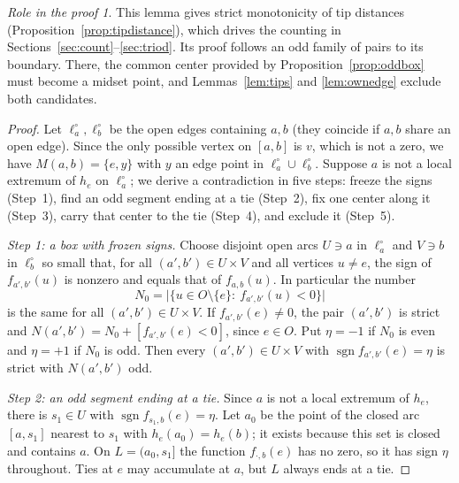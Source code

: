 \documentclass[11pt]{amsart}
\theoremstyle{definition}
\theoremstyle{remark}
\newtheorem*{role}{Role in the proof}
\newcommand{\M}{M}
\newcommand{\Odd}{O}
\newcommand{\N}{N}
\newcommand{\sgn}{\operatorname{sgn}}
\begin{document}
\begin{role}
This lemma gives strict monotonicity of tip distances (Proposition~\ref{prop:tipdistance}), which drives the counting in Sections~\ref{sec:count}--\ref{sec:triod}. Its proof follows an odd family of pairs to its boundary. There, the common center provided by Proposition~\ref{prop:oddbox} must become a midset point, and Lemmas~\ref{lem:tips} and \ref{lem:ownedge} exclude both candidates.
\end{role}

\begin{proof}
Let $\ell_a^\circ,\ell_b^\circ$ be the open edges containing $a,b$ (they coincide if $a,b$ share an open edge). Since the only possible vertex on $[a,b]$ is $v$, which is not a zero, we have $\M(a,b)=\{e,y\}$ with $y$ an edge point in $\ell_a^\circ\cup \ell_b^\circ$. Suppose $a$ is not a local extremum of $h_e$ on $\ell_a^\circ$; we derive a contradiction in five steps: freeze the signs (Step~1), find an odd segment ending at a tie (Step~2), fix one center along it (Step~3), carry that center to the tie (Step~4), and exclude it (Step~5).

\emph{Step 1: a box with frozen signs.} Choose disjoint open arcs $U\ni a$ in $\ell_a^\circ$ and $V\ni b$ in $\ell_b^\circ$ so small that, for all $(a',b')\in U\times V$ and all vertices $u\ne e$, the sign of $f_{a',b'}(u)$ is nonzero and equals that of $f_{a,b}(u)$. In particular the number
\[
  N_0=\bigl|\{u\in\Odd\setminus\{e\}:\ f_{a',b'}(u)<0\}\bigr|
\]
is the same for all $(a',b')\in U\times V$. If $f_{a',b'}(e)\ne0$, the pair $(a',b')$ is strict and $\N(a',b')=N_0+[f_{a',b'}(e)<0]$, since $e\in\Odd$. Put $\eta=-1$ if $N_0$ is even and $\eta=+1$ if $N_0$ is odd. Then every $(a',b')\in U\times V$ with $\sgn f_{a',b'}(e)=\eta$ is strict with $\N(a',b')$ odd.

\emph{Step 2: an odd segment ending at a tie.} Since $a$ is not a local extremum of $h_e$, there is $s_1\in U$ with $\sgn f_{s_1,b}(e)=\eta$. Let $a_0$ be the point of the closed arc $[a,s_1]$ nearest to $s_1$ with $h_e(a_0)=h_e(b)$; it exists because this set is closed and contains $a$. On $L=(a_0,s_1]$ the function $f_{\cdot,b}(e)$ has no zero, so it has sign $\eta$ throughout. Ties at $e$ may accumulate at $a$, but $L$ always ends at a tie.


\end{proof}
\end{document}
